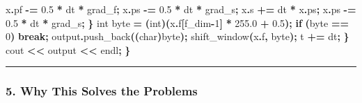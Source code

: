 \documentclass[
  11pt,
  a4paper,
]{article}
\newenvironment{Shaded}{\begin{snugshade}}{\end{snugshade}}
\newcommand{\ControlFlowTok}[1]{\textcolor[rgb]{0.13,0.29,0.53}{\textbf{#1}}}
\newcommand{\DataTypeTok}[1]{\textcolor[rgb]{0.13,0.29,0.53}{#1}}
\newcommand{\DecValTok}[1]{\textcolor[rgb]{0.00,0.00,0.81}{#1}}
\newcommand{\FloatTok}[1]{\textcolor[rgb]{0.00,0.00,0.81}{#1}}
\newcommand{\NormalTok}[1]{#1}
\newcommand{\OperatorTok}[1]{\textcolor[rgb]{0.81,0.36,0.00}{\textbf{#1}}}
\begin{document}
\begin{Shaded}
\begin{Highlighting}[]
\NormalTok{            x}\OperatorTok{.}\NormalTok{pf }\OperatorTok{{-}=} \FloatTok{0.5} \OperatorTok{*}\NormalTok{ dt }\OperatorTok{*}\NormalTok{ grad\_f}\OperatorTok{;}
\NormalTok{            x}\OperatorTok{.}\NormalTok{ps }\OperatorTok{{-}=} \FloatTok{0.5} \OperatorTok{*}\NormalTok{ dt }\OperatorTok{*}\NormalTok{ grad\_s}\OperatorTok{;}
\NormalTok{            x}\OperatorTok{.}\NormalTok{s }\OperatorTok{+=}\NormalTok{ dt }\OperatorTok{*}\NormalTok{ x}\OperatorTok{.}\NormalTok{ps}\OperatorTok{;}
\NormalTok{            x}\OperatorTok{.}\NormalTok{ps }\OperatorTok{{-}=} \FloatTok{0.5} \OperatorTok{*}\NormalTok{ dt }\OperatorTok{*}\NormalTok{ grad\_s}\OperatorTok{;}
        \OperatorTok{\}}
        \DataTypeTok{int}\NormalTok{ byte }\OperatorTok{=} \OperatorTok{(}\DataTypeTok{int}\OperatorTok{)(}\NormalTok{x}\OperatorTok{.}\NormalTok{f}\OperatorTok{[}\NormalTok{f\_dim}\OperatorTok{{-}}\DecValTok{1}\OperatorTok{]} \OperatorTok{*} \FloatTok{255.0} \OperatorTok{+} \FloatTok{0.5}\OperatorTok{);}
        \ControlFlowTok{if} \OperatorTok{(}\NormalTok{byte }\OperatorTok{==} \DecValTok{0}\OperatorTok{)} \ControlFlowTok{break}\OperatorTok{;}
\NormalTok{        output}\OperatorTok{.}\NormalTok{push\_back}\OperatorTok{((}\DataTypeTok{char}\OperatorTok{)}\NormalTok{byte}\OperatorTok{);}
\NormalTok{        shift\_window}\OperatorTok{(}\NormalTok{x}\OperatorTok{.}\NormalTok{f}\OperatorTok{,}\NormalTok{ byte}\OperatorTok{);}
\NormalTok{        t }\OperatorTok{+=}\NormalTok{ dt}\OperatorTok{;}
    \OperatorTok{\}}
\NormalTok{    cout }\OperatorTok{\textless{}\textless{}}\NormalTok{ output }\OperatorTok{\textless{}\textless{}}\NormalTok{ endl}\OperatorTok{;}
\OperatorTok{\}}
\end{Highlighting}
\end{Shaded}

\begin{center}\rule{0.5\linewidth}{0.5pt}\end{center}

\subsubsection{5. Why This Solves the
Problems}\label{why-this-solves-the-problems}
\end{document}
